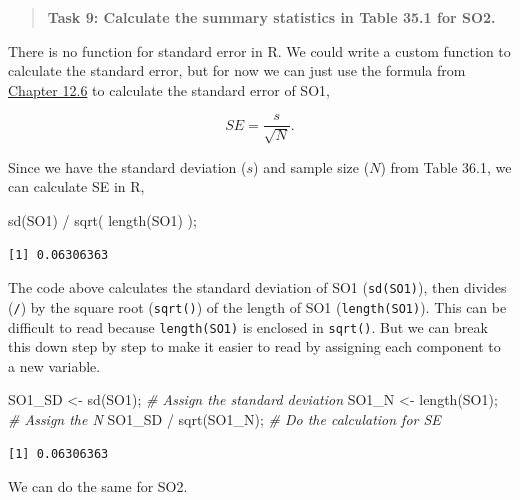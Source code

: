 \documentclass[
]{scrbook}
\newenvironment{Shaded}{\begin{snugshade}}{\end{snugshade}}
\newcommand{\CommentTok}[1]{\textcolor[rgb]{0.56,0.35,0.01}{\textit{#1}}}
\newcommand{\FunctionTok}[1]{\textcolor[rgb]{0.00,0.00,0.00}{#1}}
\newcommand{\NormalTok}[1]{#1}
\newcommand{\OtherTok}[1]{\textcolor[rgb]{0.56,0.35,0.01}{#1}}
\newcommand{\SpecialCharTok}[1]{\textcolor[rgb]{0.00,0.00,0.00}{#1}}
\begin{document}
\begin{quote}
\textbf{Task 9: Calculate the summary statistics in Table 35.1 for SO2.}
\end{quote}

There is no function for standard error in R.
We could write a custom function to calculate the standard error, but for now we can just use the formula from \protect\hyperlink{the-standard-error}{Chapter 12.6} to calculate the standard error of SO1,

\[SE = \frac{s}{\sqrt{N}}.\]

Since we have the standard deviation (\(s\)) and sample size (\(N\)) from Table 36.1, we can calculate SE in R,

\begin{Shaded}
\begin{Highlighting}[]
\FunctionTok{sd}\NormalTok{(SO1) }\SpecialCharTok{/} \FunctionTok{sqrt}\NormalTok{( }\FunctionTok{length}\NormalTok{(SO1) );}
\end{Highlighting}
\end{Shaded}

\begin{verbatim}
[1] 0.06306363
\end{verbatim}

The code above calculates the standard deviation of SO1 (\texttt{sd(SO1)}), then divides (\texttt{/}) by the square root (\texttt{sqrt()}) of the length of SO1 (\texttt{length(SO1)}).
This can be difficult to read because \texttt{length(SO1)} is enclosed in \texttt{sqrt()}.
But we can break this down step by step to make it easier to read by assigning each component to a new variable.

\begin{Shaded}
\begin{Highlighting}[]
\NormalTok{SO1\_SD }\OtherTok{\textless{}{-}} \FunctionTok{sd}\NormalTok{(SO1);     }\CommentTok{\# Assign the standard deviation}
\NormalTok{SO1\_N  }\OtherTok{\textless{}{-}} \FunctionTok{length}\NormalTok{(SO1); }\CommentTok{\# Assign the N}
\NormalTok{SO1\_SD }\SpecialCharTok{/} \FunctionTok{sqrt}\NormalTok{(SO1\_N);  }\CommentTok{\# Do the calculation for SE}
\end{Highlighting}
\end{Shaded}

\begin{verbatim}
[1] 0.06306363
\end{verbatim}

We can do the same for SO2.
\end{document}
